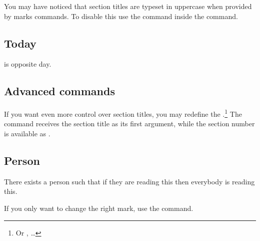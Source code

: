 You may have noticed that section titles are typeset in uppercase when provided
by marks commands. To disable this use the  command inside the
 command.
\begin{example}[standalone, paperheight=3cm]
\geometry{includehead, includefoot, headsep=.5em, footskip=1em} %
\sloppy %
\usepackage{fancyhdr}%
\usepackage{extramarks}%
\pagestyle{fancy}%
\fancyhead[R]{%
  \nouppercase{\firstleftmark}%
}

\section{Today}
is opposite day.
\end{example}


\subsection{Advanced commands}

If you want even more control over section titles, you may redefine the
.\footnote{Or ,  \ldots} The
command receives the section title as its first argument, while the section
number is available as .
\begin{example}[standalone, paperheight=4.5cm, paperwidth=4cm]
\geometry{includehead, includefoot, headsep=.5em, footskip=1em} %
\sloppy %
\usepackage{fancyhdr}%
\usepackage{extramarks}%
\pagestyle{fancy}%
\fancyhead[R]{\firstleftmark}

\section{Person}
There exists a person such that
if they are reading this then
everybody is reading this.
\end{example}
If you only want to change the right mark, use the  command.

